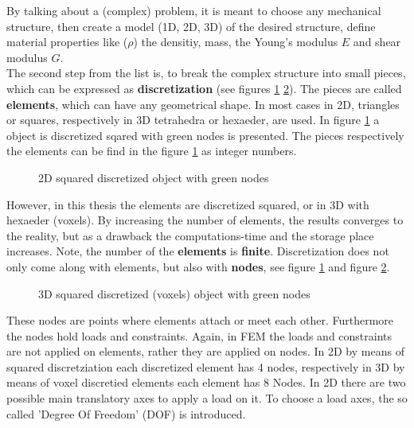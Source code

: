 By talking about a (complex) problem, it is meant to choose any mechanical structure, then create a model (1D, 2D, 3D) of the desired structure, define material properties like (\textbf{$\rho$}) the densitiy, mass, the Young's modulus \textbf{$E$} and shear modulus \textbf{$G$}.\\
The second step from the list is, to break the complex structure
 into small pieces, which can be expressed as \textbf{discretization}
 (see figures \ref{fig_2d_discr} \ref{fig_3d_discr}). The pieces are called \textbf{elements}, which can have any geometrical shape.
 In most cases in 2D, triangles or squares, respectively in 3D tetrahedra or hexaeder, are used.
 In figure \ref{fig_2d_discr} a object is discretized sqared with green nodes is presented. The pieces respectively the elements can be find in the figure \ref{fig_2d_discr} as integer numbers. \\

\begin{figure} [!h]
 \centering
 \def\svgwidth{\textwidth}
 
 \caption{2D squared discretized object with green nodes} %
 \label{fig_2d_discr}   %
\end{figure} 

 However, in this thesis the elements are discretized squared, or in 3D
 with hexaeder (voxels). By increasing the number of elements, the results
 converges to the reality, but as a drawback the computations-time and the storage place increases. Note, the number of the \textbf{elements} is \textbf{finite}. Discretization does not only come along with elements, but also with \textbf{nodes}, see figure \ref{fig_2d_discr} and figure \ref{fig_3d_discr}. 
 
 \begin{figure} [!h]
 \centering
 \def\svgwidth{\textwidth}
 
 \caption{3D squared discretized (voxels) object with green nodes} %
 \label{fig_3d_discr}   %
\end{figure} 

These nodes are points where elements attach or meet each other. Furthermore the nodes hold loads and constraints. Again, in FEM the loads and constraints are not applied on elements, rather they are applied on nodes. In 2D by means of squared discretziation each discretized element has 4 nodes, respectively in 3D by means of voxel discretied elements each element has 8 Nodes. In 2D there are two possible
main translatory axes to apply a load on it. To choose a load
axes, the so called 'Degree Of Freedom' (DOF) is introduced. \\

